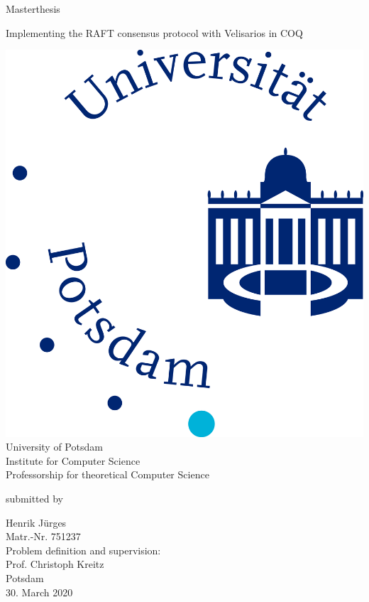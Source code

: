 \documentclass[11pt, a4paper]{article}
\begin{document}
          

\begin{titlepage}
  \begin{center} 
    \mbox{}
    
    {\large \sc Masterthesis} \\    

    \vspace{1cm}
  
    {\huge Implementing the RAFT consensus protocol with Velisarios in COQ\\[1em] {\LARGE}}  
        
    \vspace{2cm}
    
    \includegraphics[scale=0.05]{images/Mathnatlogo.jpg}\\[1em]
    University of Potsdam\\
    Institute for Computer Science\\
    Professorship for theoretical Computer Science
    
    \vspace{2cm}
    
		submitted by
		
    \vspace{1em}
    
		{\Large Henrik Jürges} \\
        {Matr.-Nr. 751237}\\

    \vspace{2em}
        {Problem definition and supervision:}\\
        {Prof. Christoph Kreitz}\\
		
    \vspace{3em}    
    Potsdam\\
    30. March 2020
  \end{center}
\end{titlepage}
\end{document}
